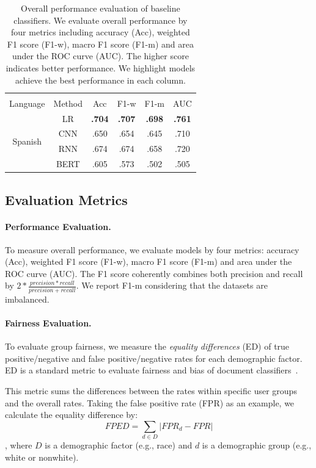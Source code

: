 \begin{table}[b!]
\begin{tabular}{cc|cccc}
\multicolumn{6}{c}{} \\
Language & Method & Acc & F1-w & F1-m & AUC \\\hline
\multirow{4}{*}{Spanish} & LR & \textbf{.704} & \textbf{.707} & \textbf{.698} & \textbf{.761} \\
 & CNN & .650 & .654 & .645 & .710\\
 & RNN & .674 & .674 & .658 & .720 \\
 & BERT & .605 & .573 & .502 & .505
\end{tabular}
\caption{Overall performance evaluation of baseline classifiers. We evaluate overall performance by four metrics including accuracy (Acc), weighted F1 score (F1-w), macro F1 score (F1-m) and area under the ROC curve (AUC). The higher score indicates better performance. We highlight models achieve the best performance in each column.}
\label{chap5:tab:perform}
\end{table}


\subsection{Evaluation Metrics}
\label{chap5:subsec:metrics}

\paragraph{Performance Evaluation.}
To measure overall performance, we evaluate models by four metrics: accuracy (Acc), weighted F1 score (F1-w), macro F1 score (F1-m) and area under the ROC curve (AUC). 
The F1 score coherently combines both precision and recall by $2*\frac{precision*recall}{precision+recall}$.
We report F1-m considering that the datasets are imbalanced.

\paragraph{Fairness Evaluation.}
To evaluate {group fairness}, we measure the \textit{equality differences} (ED) of true positive/negative and false positive/negative rates for each demographic factor. 
ED is a standard metric to evaluate fairness and bias of document classifiers~\cite{dixon2018measuring,park2018reducing,garg2019counterfactual}.

This metric sums the differences between the rates within specific user groups and the overall rates.
Taking the false positive rate (FPR) as an example, we calculate the equality difference by:
$$FPED = \sum_{d \in D}|FPR_d - FPR|$$
, where $D$ is a demographic factor (e.g., race) and $d$ is a demographic group (e.g., white or nonwhite).


